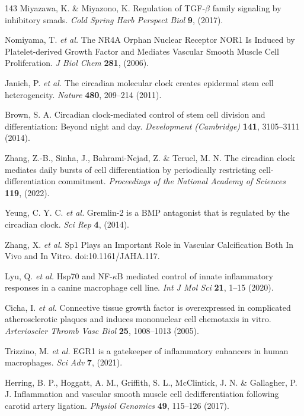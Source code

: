 \documentclass[12pt]{article}
\begin{document}
\begin{thebibliography}{143}
 Miyazawa, K. \& Miyazono, K. Regulation of TGF-$\beta$ family signaling by inhibitory smads. \textit{Cold Spring Harb Perspect Biol} \textbf{9}, (2017).

 Nomiyama, T. \textit{et al.} The NR4A Orphan Nuclear Receptor NOR1 Is Induced by Platelet-derived Growth Factor and Mediates Vascular Smooth Muscle Cell Proliferation. \textit{J Biol Chem} \textbf{281}, (2006).

 Janich, P. \textit{et al.} The circadian molecular clock creates epidermal stem cell heterogeneity. \textit{Nature} \textbf{480}, 209--214 (2011).

 Brown, S. A. Circadian clock-mediated control of stem cell division and differentiation: Beyond night and day. \textit{Development (Cambridge)} \textbf{141}, 3105--3111 (2014).

 Zhang, Z.-B., Sinha, J., Bahrami-Nejad, Z. \& Teruel, M. N. The circadian clock mediates daily bursts of cell differentiation by periodically restricting cell-differentiation commitment. \textit{Proceedings of the National Academy of Sciences} \textbf{119}, (2022).

 Yeung, C. Y. C. \textit{et al.} Gremlin-2 is a BMP antagonist that is regulated by the circadian clock. \textit{Sci Rep} \textbf{4}, (2014).

 Zhang, X. \textit{et al.} Sp1 Plays an Important Role in Vascular Calcification Both In Vivo and In Vitro. doi:10.1161/JAHA.117.

 Lyu, Q. \textit{et al.} Hsp70 and NF-$\kappa$B mediated control of innate inflammatory responses in a canine macrophage cell line. \textit{Int J Mol Sci} \textbf{21}, 1--15 (2020).

 Cicha, I. \textit{et al.} Connective tissue growth factor is overexpressed in complicated atherosclerotic plaques and induces mononuclear cell chemotaxis in vitro. \textit{Arterioscler Thromb Vasc Biol} \textbf{25}, 1008--1013 (2005).

 Trizzino, M. \textit{et al.} EGR1 is a gatekeeper of inflammatory enhancers in human macrophages. \textit{Sci Adv} \textbf{7}, (2021).

 Herring, B. P., Hoggatt, A. M., Griffith, S. L., McClintick, J. N. \& Gallagher, P. J. Inflammation and vascular smooth muscle cell dedifferentiation following carotid artery ligation. \textit{Physiol Genomics} \textbf{49}, 115--126 (2017).


\end{thebibliography}
\end{document}
